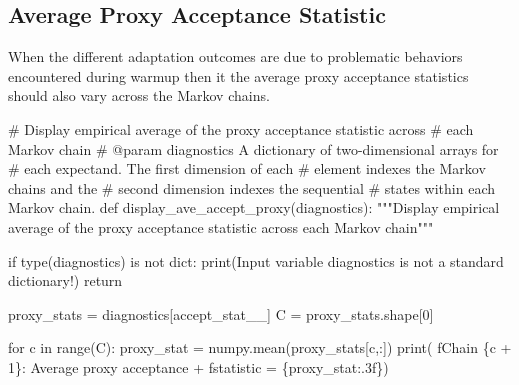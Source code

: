 \documentclass[
  letterpaper,
  DIV=11,
  numbers=noendperiod]{scrartcl}
\newenvironment{Shaded}{\begin{snugshade}}{\end{snugshade}}
\newcommand{\BuiltInTok}[1]{\textcolor[rgb]{0.00,0.23,0.31}{#1}}
\newcommand{\CommentTok}[1]{\textcolor[rgb]{0.37,0.37,0.37}{#1}}
\newcommand{\ControlFlowTok}[1]{\textcolor[rgb]{0.00,0.23,0.31}{#1}}
\newcommand{\DecValTok}[1]{\textcolor[rgb]{0.68,0.00,0.00}{#1}}
\newcommand{\KeywordTok}[1]{\textcolor[rgb]{0.00,0.23,0.31}{#1}}
\newcommand{\NormalTok}[1]{\textcolor[rgb]{0.00,0.23,0.31}{#1}}
\newcommand{\OperatorTok}[1]{\textcolor[rgb]{0.37,0.37,0.37}{#1}}
\newcommand{\SpecialCharTok}[1]{\textcolor[rgb]{0.37,0.37,0.37}{#1}}
\newcommand{\SpecialStringTok}[1]{\textcolor[rgb]{0.13,0.47,0.30}{#1}}
\newcommand{\StringTok}[1]{\textcolor[rgb]{0.13,0.47,0.30}{#1}}
\begin{document}
\hypertarget{average-proxy-acceptance-statistic}{%
\subsection{Average Proxy Acceptance
Statistic}\label{average-proxy-acceptance-statistic}}

When the different adaptation outcomes are due to problematic behaviors
encountered during warmup then it the average proxy acceptance
statistics should also vary across the Markov chains.

\begin{Shaded}
\begin{Highlighting}[]
\CommentTok{\# Display empirical average of the proxy acceptance statistic across }
\CommentTok{\# each Markov chain}
\CommentTok{\# @param diagnostics A dictionary of two{-}dimensional arrays for }
\CommentTok{\#                    each expectand.  The first dimension of each}
\CommentTok{\#                    element indexes the Markov chains and the }
\CommentTok{\#                    second dimension indexes the sequential }
\CommentTok{\#                    states within each Markov chain.}
\KeywordTok{def}\NormalTok{ display\_ave\_accept\_proxy(diagnostics):}
  \CommentTok{"""Display empirical average of the proxy acceptance statistic}
\CommentTok{     across each Markov chain"""}
     
  \ControlFlowTok{if} \BuiltInTok{type}\NormalTok{(diagnostics) }\KeywordTok{is} \KeywordTok{not} \BuiltInTok{dict}\NormalTok{:}
    \BuiltInTok{print}\NormalTok{(}\StringTok{\textquotesingle{}Input variable \textasciigrave{}diagnostics\textasciigrave{} is not a standard dictionary!\textquotesingle{}}\NormalTok{)}
    \ControlFlowTok{return}
  
\NormalTok{  proxy\_stats }\OperatorTok{=}\NormalTok{ diagnostics[}\StringTok{\textquotesingle{}accept\_stat\_\_\textquotesingle{}}\NormalTok{]}
\NormalTok{  C }\OperatorTok{=}\NormalTok{ proxy\_stats.shape[}\DecValTok{0}\NormalTok{]}
  
  \ControlFlowTok{for}\NormalTok{ c }\KeywordTok{in} \BuiltInTok{range}\NormalTok{(C):}
\NormalTok{    proxy\_stat }\OperatorTok{=}\NormalTok{ numpy.mean(proxy\_stats[c,:])}
    \BuiltInTok{print}\NormalTok{(  }\SpecialStringTok{f\textquotesingle{}Chain }\SpecialCharTok{\{}\NormalTok{c }\OperatorTok{+} \DecValTok{1}\SpecialCharTok{\}}\SpecialStringTok{: Average proxy acceptance \textquotesingle{}}
          \OperatorTok{+} \SpecialStringTok{f\textquotesingle{}statistic = }\SpecialCharTok{\{}\NormalTok{proxy\_stat}\SpecialCharTok{:.3f\}}\SpecialStringTok{\textquotesingle{}}\NormalTok{)}
\end{Highlighting}
\end{Shaded}
\end{document}
